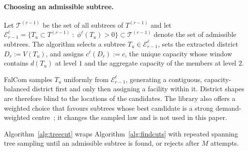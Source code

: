 \documentclass[11pt]{article}
\theoremstyle{definition}
\begin{document}
\paragraph{Choosing an admissible subtree.} Let $\mathcal{T}^{(r-1)}$ be the set of all subtrees of $T^{(r-1)}$ and let $\mathcal{E}^{\ell}_{r-1} = \{T_u \subset T^{(r-1)} \; : \; \phi^{\ell}(T_u) > 0 \} \subset \mathcal{T}^{(r-1)}$ denote the set of admissible subtrees. The algorithm selects a subtree $T_u \in \mathcal{E}^{\ell}_{r-1}$, sets the extracted district $D_r := V(T_u)$, and assigns $c^{\ell}(D_r) := c$, the unique capacity whose window contains $d(T_u)$ at level $1$ and the aggregate capacity of the members at level $2$. 

FalCom samples $T_u$ uniformly from $\mathcal{E}^{\ell}_{r-1}$, generating a contiguous, capacity-balanced district first and only then assigning a facility within it. District shapes are therefore blind to the locations of the candidates. The library also offers a weighted choice that favours subtrees whose best candidate is a strong demand-weighted centre~\citep{falcomchain}; it changes the sampled law and is not used in this paper.

Algorithm~\ref{alg:treecut} wraps Algorithm~\ref{alg:findcuts} with repeated spanning tree sampling until an admissible subtree is found, or rejects after $M$ attempts.

\medskip

\begin{algorithm}[tbp]
\LinesNumbered
\caption{Capacitated Tree Cut}\label{alg:treecut}
\vspace{1mm}

\BlankLine

\end{algorithm}
\end{document}
